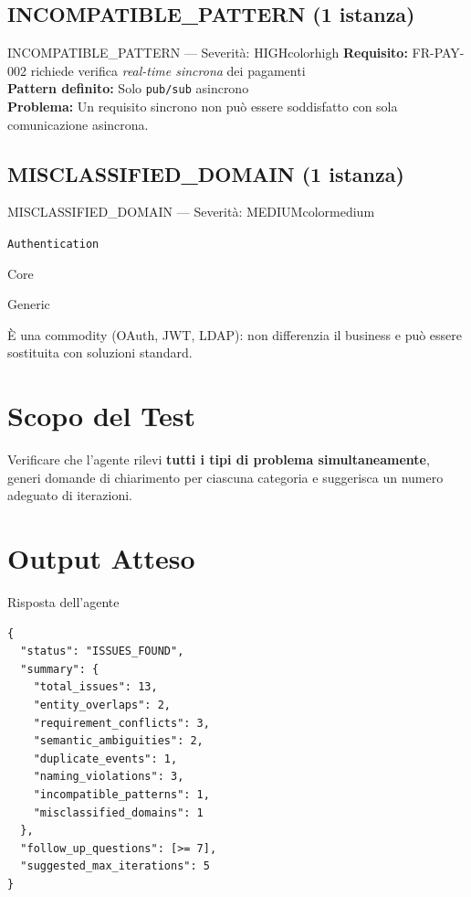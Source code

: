\documentclass[12pt,a4paper]{report}
\begin{document}
\subsection{INCOMPATIBLE\_PATTERN (1 istanza)}

\begin{issuebox}{INCOMPATIBLE\_PATTERN --- Severità: HIGH}{colorhigh}
\textbf{Requisito:} FR-PAY-002 richiede verifica \textit{real-time sincrona} dei pagamenti \\
\textbf{Pattern definito:} Solo \texttt{pub/sub} asincrono \\
\textbf{Problema:} Un requisito sincrono non può essere soddisfatto con sola comunicazione asincrona.
\end{issuebox}

\subsection{MISCLASSIFIED\_DOMAIN (1 istanza)}

\begin{issuebox}{MISCLASSIFIED\_DOMAIN --- Severità: MEDIUM}{colormedium}
\begin{description}[leftmargin=4.5cm, labelwidth=4.3cm]
  \item[Dominio]                   \texttt{Authentication}
  \item[Classificazione attuale]   Core
  \item[Classificazione corretta]  Generic
  \item[Motivazione]               È una commodity (OAuth, JWT, LDAP): non differenzia il business
                                   e può essere sostituita con soluzioni standard.
\end{description}
\end{issuebox}

\section{Scopo del Test}

Verificare che l'agente rilevi \textbf{tutti i tipi di problema simultaneamente}, generi
domande di chiarimento per ciascuna categoria e suggerisca un numero adeguato di iterazioni.
\clearpage
\section{Output Atteso}

\begin{outputbox}{Risposta dell'agente}
\begin{lstlisting}
{
  "status": "ISSUES_FOUND",
  "summary": {
    "total_issues": 13,
    "entity_overlaps": 2,
    "requirement_conflicts": 3,
    "semantic_ambiguities": 2,
    "duplicate_events": 1,
    "naming_violations": 3,
    "incompatible_patterns": 1,
    "misclassified_domains": 1
  },
  "follow_up_questions": [>= 7],
  "suggested_max_iterations": 5
}
\end{lstlisting}
\end{outputbox}
\end{document}
